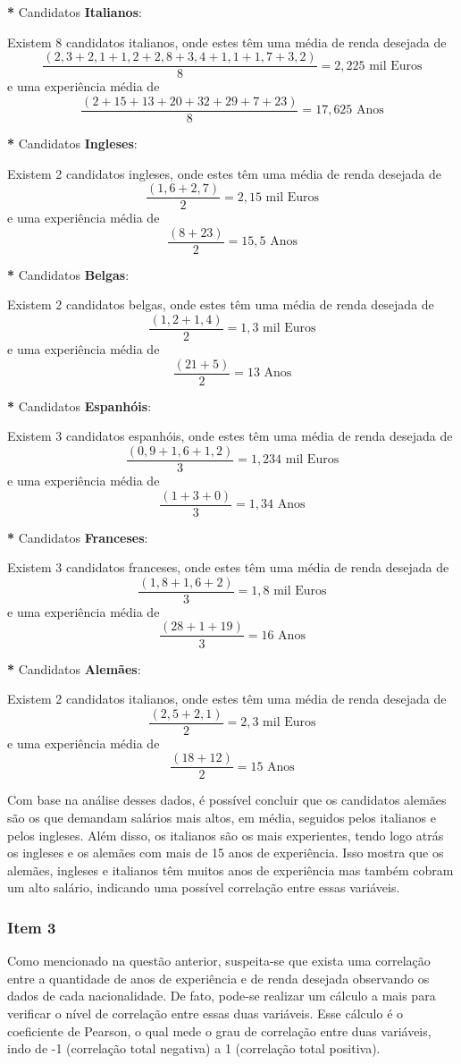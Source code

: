 \documentclass[a4paper,11pt]{article}
\begin{document}
\textbf{*} Candidatos \textbf{Italianos}:

Existem 8 candidatos italianos, onde estes têm uma média de renda desejada de
\[\frac{(2,3+2,1+1,2+2,8+3,4+1,1+1,7+3,2)}{8} = 2,225 \text{ mil Euros}\] e uma experiência média de \[\frac{(2+15+13+20+32+29+7+23)}{8} = 17,625 \text{ Anos}\]

\textbf{*} Candidatos \textbf{Ingleses}:

Existem 2 candidatos ingleses, onde estes têm uma média de renda desejada de
\[\frac{(1,6+2,7)}{2} = 2,15 \text{ mil Euros}\] e uma experiência média de \[\frac{(8+23)}{2} = 15,5 \text{ Anos}\]

\textbf{*} Candidatos \textbf{Belgas}:

Existem 2 candidatos belgas, onde estes têm uma média de renda desejada de
\[\frac{(1,2+1,4)}{2} = 1,3 \text{ mil Euros}\] e uma experiência média de \[\frac{(21+5)}{2} = 13 \text{ Anos}\]

\textbf{*} Candidatos \textbf{Espanhóis}:

Existem 3 candidatos espanhóis, onde estes têm uma média de renda desejada de
\[\frac{(0,9+ 1,6+1,2)}{3} = 1,234 \text{ mil Euros}\] e uma experiência média de \[\frac{(1+3+0)}{3} = 1,34 \text{ Anos}\]

\textbf{*} Candidatos \textbf{Franceses}:

Existem 3 candidatos franceses, onde estes têm uma média de renda desejada de
\[\frac{(1,8+1,6+2)}{3} = 1,8 \text{ mil Euros}\] e uma experiência média de \[\frac{(28+1+19)}{3} = 16 \text{ Anos}\]

\textbf{*} Candidatos \textbf{Alemães}:

Existem 2 candidatos italianos, onde estes têm uma média de renda desejada de
\[\frac{(2,5+2,1)}{2} = 2,3 \text{ mil Euros}\] e uma experiência média de \[\frac{(18+12)}{2} = 15 \text{ Anos}\]

Com base na análise desses dados, é possível concluir que os candidatos alemães são os que demandam salários mais altos, em média, seguidos pelos italianos e pelos ingleses. Além disso, os italianos são os mais experientes, tendo logo atrás os ingleses e os alemães com mais de 15 anos de experiência. Isso mostra que os alemães, ingleses e italianos têm muitos anos de experiência mas também cobram um alto salário, indicando uma possível correlação entre essas variáveis.

\subsubsection{Item 3}
Como mencionado na questão anterior, suspeita-se que exista uma correlação entre a quantidade de anos de experiência e de renda desejada observando os dados de cada nacionalidade. De fato, pode-se realizar um cálculo a mais para verificar o nível de correlação entre essas duas variáveis. Esse cálculo é o coeficiente de Pearson, o qual mede o grau de correlação entre duas variáveis, indo de -1 (correlação total negativa) a 1 (correlação total positiva).
\end{document}
